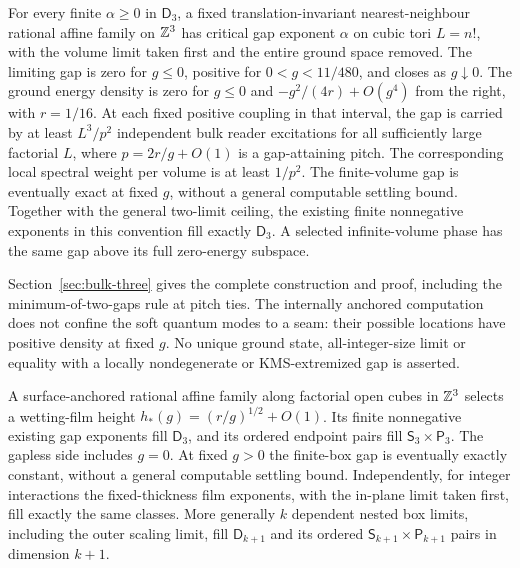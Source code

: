 \begin{theorem}\label{thm:bulk-three}
For every finite $\alpha\geq0$ in $\mathsf D_3$, a fixed
translation-invariant nearest-neighbour rational affine family on $\mathbb Z^3$
has critical gap exponent $\alpha$ on cubic tori $L=n!$, with the volume
limit taken first and the entire ground space removed. The limiting gap
is zero for $g\leq0$, positive for $0<g<11/480$, and closes as
$g\downarrow0$. The ground energy density is zero for $g\leq0$ and
$-g^2/(4r)+O(g^4)$ from the right, with $r=1/16$.
At each fixed positive coupling in that interval, the gap is carried by
at least $L^3/p^2$ independent bulk reader excitations for all sufficiently
large factorial $L$, where $p=2r/g+O(1)$ is a gap-attaining pitch.
The corresponding local spectral weight per volume is at least $1/p^2$.
The finite-volume gap is eventually exact at fixed $g$, without a
general computable settling bound. Together with the general two-limit
ceiling, the existing finite nonnegative exponents in this convention
fill exactly $\mathsf D_3$. A selected infinite-volume phase has the
same gap above its full zero-energy subspace.
\end{theorem}

Section~\ref{sec:bulk-three} gives the complete construction and proof,
including the minimum-of-two-gaps rule at pitch ties. The internally
anchored computation does not confine the soft quantum modes to a seam:
their possible locations have positive density at fixed $g$. No unique
ground state, all-integer-size limit or equality with a locally
nondegenerate or KMS-extremized gap is asserted.

\begin{theorem}\label{thm:film-headline}
A surface-anchored rational affine family along factorial open cubes in $\mathbb Z^3$
selects a wetting-film height $h_*(g)=(r/g)^{1/2}+O(1)$.
Its finite nonnegative existing gap exponents fill $\mathsf D_3$, and
its ordered endpoint pairs fill $\mathsf S_3\times\mathsf P_3$.
The gapless side includes $g=0$. At fixed $g>0$ the finite-box gap is
eventually exactly constant, without a general computable settling bound.
Independently, for integer interactions the fixed-thickness film
exponents, with the in-plane limit taken first, fill exactly the same
classes. More generally $k$ dependent nested box limits, including the
outer scaling limit, fill $\mathsf D_{k+1}$ and its ordered
$\mathsf S_{k+1}\times\mathsf P_{k+1}$ pairs in dimension $k+1$.
\end{theorem}

